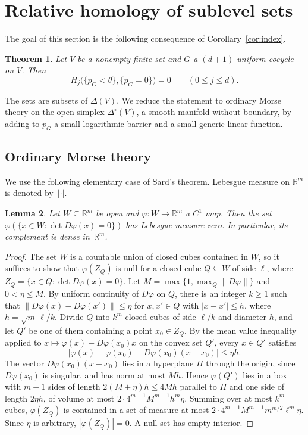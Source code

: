 \documentclass[11pt]{article}
\newtheorem{theorem}{Theorem}[section]
\newtheorem{lemma}[theorem]{Lemma}
\theoremstyle{definition}
\numberwithin{equation}{section}
\newcommand{\R}{\mathbb R}
\begin{document}
\section{Relative homology of sublevel sets}\label{sec:morse}

The goal of this section is the following consequence of Corollary~\ref{cor:index}.

\begin{theorem}\label{thm:weights}
Let $V$ be a nonempty finite set and $G$ a $(d+1)$-uniform cocycle on $V$. Then
\begin{equation*}
 H_j\bigl(\{p_G<\theta\},\{p_G=0\}\bigr)=0\qquad(0\le j\le d).
\end{equation*}
\end{theorem}

The sets are subsets of $\Delta(V)$. We reduce the statement to ordinary Morse theory on the open simplex $\Delta^\circ(V)$, a smooth manifold without boundary, by adding to $p_G$ a small logarithmic barrier and a small generic linear function.

\subsection{Ordinary Morse theory}

We use the following elementary case of Sard's theorem. Lebesgue measure on $\R^m$ is denoted by~$|\cdot|$.

\begin{lemma}\label{lem:sard}
Let $W\subseteq\R^m$ be open and $\varphi:W\to\R^m$ a $C^1$ map. Then the set $\varphi(\{x\in W:\det D\varphi(x)=0\})$ has Lebesgue measure zero. In particular, its complement is dense in~$\R^m$.
\end{lemma}
\begin{proof}
The set $W$ is a countable union of closed cubes contained in $W$, so it suffices to show that $\varphi(Z_Q)$ is null for a closed cube $Q\subseteq W$ of side $\ell$, where $Z_Q=\{x\in Q:\det D\varphi(x)=0\}$. Let $M=\max\{1,\max_Q\|D\varphi\|\}$ and $0<\eta\le M$. By uniform continuity of $D\varphi$ on $Q$, there is an integer $k\ge1$ such that $\|D\varphi(x)-D\varphi(x')\|\le\eta$ for $x,x'\in Q$ with $|x-x'|\le h$, where $h=\sqrt m\,\ell/k$. Divide $Q$ into $k^m$ closed cubes of side $\ell/k$ and diameter $h$, and let $Q'$ be one of them containing a point $x_0\in Z_Q$. By the mean value inequality applied to $x\mapsto\varphi(x)-D\varphi(x_0)x$ on the convex set $Q'$, every $x\in Q'$ satisfies
\begin{equation*}
 \bigl|\varphi(x)-\varphi(x_0)-D\varphi(x_0)(x-x_0)\bigr|\le\eta h.
\end{equation*}
The vector $D\varphi(x_0)(x-x_0)$ lies in a hyperplane $\Pi$ through the origin, since $D\varphi(x_0)$ is singular, and has norm at most $Mh$. Hence $\varphi(Q')$ lies in a box with $m-1$ sides of length $2(M+\eta)h\le4Mh$ parallel to $\Pi$ and one side of length $2\eta h$, of volume at most $2\cdot4^{m-1}M^{m-1}h^m\eta$. Summing over at most $k^m$ cubes, $\varphi(Z_Q)$ is contained in a set of measure at most $2\cdot4^{m-1}M^{m-1}m^{m/2}\ell^m\eta$. Since $\eta$ is arbitrary, $|\varphi(Z_Q)|=0$. A null set has empty interior.
\end{proof}
\end{document}
